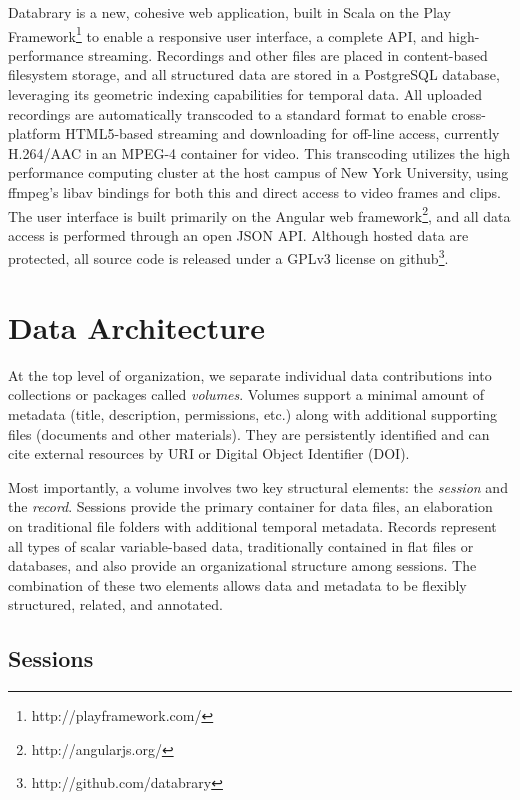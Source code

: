 \documentclass{sig-alternate}
\begin{document}
Databrary is a new, cohesive web application, built in Scala on the Play Framework\footnote{http://playframework.com/} to enable a responsive user interface, a complete API, and high-performance streaming.
Recordings and other files are placed in content-based filesystem storage, and all structured data are stored in a PostgreSQL database, leveraging its geometric indexing capabilities for temporal data.
All uploaded recordings are automatically transcoded to a standard format to enable cross-platform HTML5-based streaming and downloading for off-line access, currently H.264/AAC in an MPEG-4 container for video.
This transcoding utilizes the high performance computing cluster at the host campus of New York University, using ffmpeg's libav bindings for both this and direct access to video frames and clips.
The user interface is built primarily on the Angular web framework\footnote{http://angularjs.org/}, and all data access is performed through an open JSON API.
Although hosted data are protected, all source code is released under a GPLv3 license on github\footnote{http://github.com/databrary}.

\section{Data Architecture}

At the top level of organization, we separate individual data contributions into collections or packages called \emph{volumes}.
Volumes support a minimal amount of metadata (title, description, permissions, etc.) along with additional supporting files (documents and other materials).
They are persistently identified and can cite external resources by URI or Digital Object Identifier (DOI).

Most importantly, a volume involves two key structural elements: the \emph{session} and the \emph{record}.
Sessions provide the primary container for data files, an elaboration on traditional file folders with additional temporal metadata.
Records represent all types of scalar variable-based data, traditionally contained in flat files or databases, and also provide an organizational structure among sessions.
The combination of these two elements allows data and metadata to be flexibly structured, related, and annotated.

\subsection{Sessions}
\end{document}

